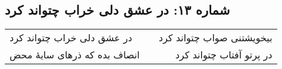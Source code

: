 \begin{center}
\section*{شماره ۱۳: در عشق دلی خراب چتواند کرد}
\label{sec:013}
\begin{longtable}{l p{0.5cm} r}
در عشق دلی خراب چتواند کرد
&&
بیخویشتنی صواب چتواند کرد
\\
انصاف بده که ذرهای سایهٔ محض
&&
در پرتو آفتاب چتواند کرد
\\
\end{longtable}
\end{center}

